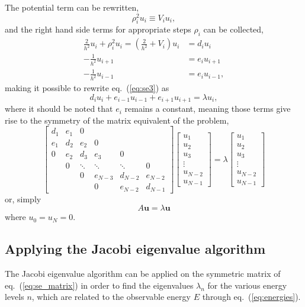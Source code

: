 \documentclass[a4paper,11pt]{article}
\begin{document}
The potential term can be rewritten,
\[ \rho_i^2 u_i \equiv V_i u_i, \]
and the right hand side terms for appropriate steps $\rho_i$ can be collected,
\begin{align*}
    \frac{2}{h^2} u_i + \rho_i^2 u_i = \left( \frac{2}{h^2} + V_i \right) u_i &= d_i u_i \\
    -\frac{1}{h^2}u_{i+1} &= e_i u_{i+1} \\
    -\frac{1}{h^2}u_{i-1} &= e_i u_{i-1},
\end{align*}
making it possible to rewrite eq.~(\ref{eq:se3}) as
\[ d_i u_i + e_{i-1} u_{i-1} + e_{i+1} u_{i+1} = \lambda u_i, \]
where it should be noted that $e_i$ remains a constant, meaning those terms give rise to the symmetry of the matrix equivalent of the problem,
\begin{equation}
    \begin{bmatrix}
        d_1     & e_1   & 0     &       &       &  \\
        e_1     & d_2   & e_2   & 0     &       &  \\
        0       & e_2   & d_3   & e_3   & 0     &  \\
                & 0     &\ddots & \ddots& \ddots& 0\\
                &       & 0     &e_{N-3}&d_{N-2}&e_{N-2} \\
                &       &       & 0     &e_{N-2}&d_{N-1}
    \end{bmatrix}
    \begin{bmatrix}
        u_1 \\ u_2 \\ u_3 \\ \vdots \\ u_{N-2} \\ u_{N-1}
    \end{bmatrix}
     =
    \lambda
    \begin{bmatrix}
        u_1 \\ u_2 \\ u_3 \\ \vdots \\ u_{N-2} \\ u_{N-1}
    \end{bmatrix}
    \label{eq:se_matrix}
\end{equation}
or, simply
\begin{equation}
    A \mathbf{u} = \lambda \mathbf{u}
    \label{eq:se_vector}
\end{equation}
where $u_{0} = u_N = 0$.

\subsection{Applying the Jacobi eigenvalue algorithm}
The Jacobi eigenvalue algorithm can be applied on the symmetric matrix of eq.~(\ref{eq:se_matrix}) in order to find the eigenvalues $\lambda_n$ for the various energy levels $n$, which are related to the observable energy $E$ through eq.~(\ref{eq:energies}). 
\end{document}
